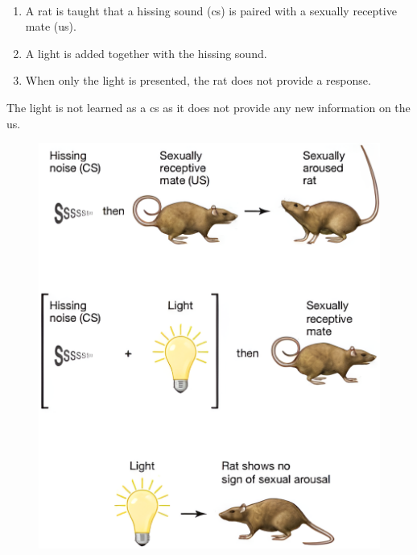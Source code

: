 \begin{casestudy}
    \phantom{} \label{ex:blocking} \\
    \begin{minipage}{0.65\linewidth}
        \begin{enumerate}
            \item A rat is taught that a hissing sound (\ac{cs}) is paired with a sexually receptive mate (\ac{us}).
            \item A light is added together with the hissing sound.
            \item When only the light is presented, the rat does not provide a response.
        \end{enumerate}

        The light is not learned as a \ac{cs} as it does not provide any new information on the \ac{us}.
    \end{minipage}
    \begin{minipage}{0.35\linewidth}
        \begin{figure}[H]
            \centering
            \includegraphics[width=\linewidth]{./img/surprise_rats.png}
        \end{figure}
    \end{minipage}
\end{casestudy}




